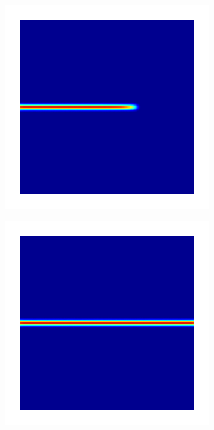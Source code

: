 \begin{figure}[htb!]
\begin{subfigure}[b]{0.21\textwidth}
    \caption{}
    \label{fig: Chapter4/intact_plate_initial}
  \end{subfigure}
  \begin{subfigure}[b]{0.21\textwidth}
    \centering
    \includegraphics[width=\textwidth,scale=0.5]{Chapter4/figures/mode1_intact_plate_intermediate.png}
    \caption{}
  \end{subfigure}
  \begin{subfigure}[b]{0.21\textwidth}
    \centering
    \includegraphics[width=\textwidth,scale=0.5]{Chapter4/figures/mode1_intact_plate_final.png}

\end{subfigure}
\end{figure}

